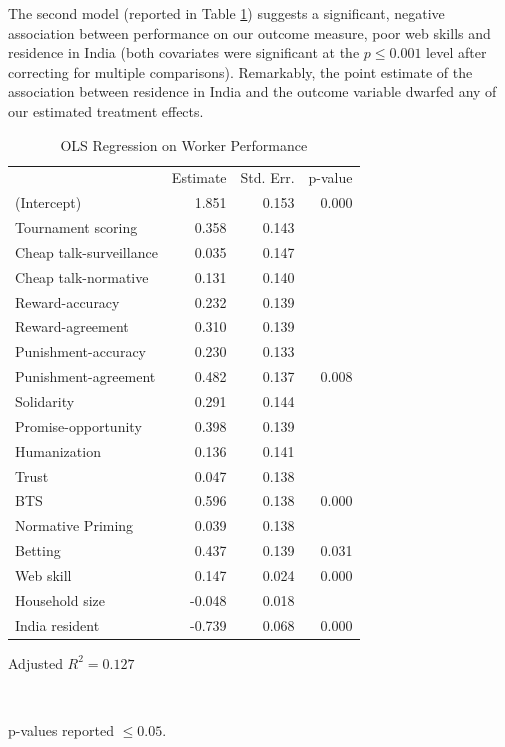 \documentclass{cscw2010}
\begin{document}
The second model (reported in Table \ref{table:demog_control_model})
suggests a significant, negative association between performance on
our outcome measure, poor web skills and residence in India (both
covariates were significant at the $p \leq 0.001$ level after
correcting for multiple comparisons). Remarkably, the point estimate
of the association between residence in India and the outcome variable
dwarfed any of our estimated treatment effects.

\begin{table}[ht]					%
\begin{center}						%
\caption{OLS Regression on Worker Performance} %
\vspace{8pt}
\begin{threeparttable}
\begin{tabular}{@{}l r  r r@{}}
\toprule
 & Estimate & Std. Err. & p-value\tnote{\dag}\\
\cmidrule(l){2-4}
(Intercept) & 1.851 & 0.153 & 0.000\\
Tournament scoring & 0.358 & 0.143 &\\
Cheap talk-surveillance & 0.035 & 0.147 &\\
Cheap talk-normative & 0.131 & 0.140 &\\
Reward-accuracy & 0.232 & 0.139 &\\
Reward-agreement & 0.310 & 0.139 &\\
Punishment-accuracy & 0.230 & 0.133 &\\
Punishment-agreement & 0.482 & 0.137 & 0.008\\
Solidarity & 0.291 & 0.144 &\\
Promise-opportunity & 0.398 & 0.139 &\\
Humanization & 0.136 & 0.141 &\\
Trust & 0.047 & 0.138 &\\
BTS & 0.596 & 0.138 & 0.000\\
Normative Priming & 0.039 & 0.138 &\\
Betting & 0.437 & 0.139 & 0.031\\
Web skill & 0.147 & 0.024 & 0.000\\
Household size  & -0.048 & 0.018 &\\
India resident & -0.739 & 0.068 & 0.000\\
\bottomrule
\end{tabular}
  \begin{tablenotes}[para]
	\small{\item Adjusted $R^{2} = 0.127$}\\
	\item[\dag]p-values reported $\leq 0.05$.\\
  \end{tablenotes}
\end{threeparttable}
\label{table:demog_control_model}
\end{center}
\end{table}
\end{document}
